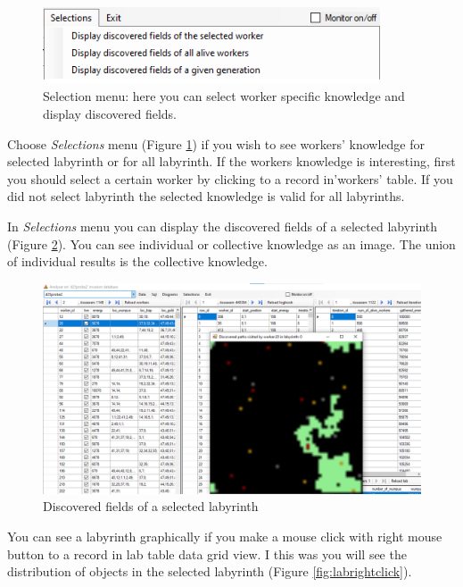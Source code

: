 \documentclass[a4paper,12pt]{article}
\begin{document}
\begin{figure}
	\begin{center}
		\includegraphics[width=10cm]{mnuselections.png}
		\caption{Selection menu: here you can select worker specific knowledge and display discovered fields.}
		\label{fig:mnuselections}
	\end{center}
\end{figure}

Choose \textit{Selections} menu (Figure \ref{fig:mnuselections}) if you wish to see workers' knowledge for selected labyrinth or for all labyrinth. If the workers knowledge is interesting, first you should select a certain worker by clicking to a record in'workers' table. If you did not select labyrinth the selected knowledge is valid for all labyrinths.

In \textit{Selections} menu you can display the discovered fields of a selected labyrinth (Figure \ref{fig:discoverlab1}). You can see individual or collective knowledge as an image. The union of individual results is the collective knowledge.


\begin{figure}
	\begin{center}
		\includegraphics[width=15cm]{discoverlab1.png}
		\caption{Discovered fields of a selected labyrinth}
		\label{fig:discoverlab1}
	\end{center}
\end{figure}

You can see a labyrinth graphically if you make a mouse click with right mouse button to a record in lab table data grid view. I  this was you will see the distribution of objects in the selected labyrinth (Figure \ref{fig:labrightclick}).
\end{document}

